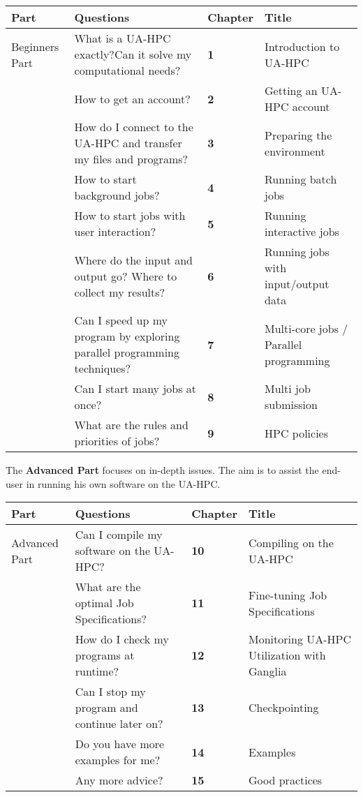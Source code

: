 \begin{tabular}{|p{0.3in}|p{2.0in}|p{0.5in}|p{1.5in}|} \hline
\textbf{Part} & \textbf{Questions} & \textbf{Chapter} & \textbf{Title} \\ \hline
Beginners Part & What is a UA-HPC exactly?\newline Can it solve my computational needs? & \textbf{1} & Introduction to UA-HPC \\ \hline
& How to get an account? & \textbf{2} & Getting an UA-HPC account \\ \hline
& How do I connect to the UA-HPC and transfer my files and programs? & \textbf{3} & Preparing the environment \\ \hline
& How to start background jobs? & \textbf{4} & Running batch jobs \\ \hline
& How to start jobs with user interaction? & \textbf{5} & Running interactive jobs \\ \hline
& Where do the input and output go? Where to collect my results? & \textbf{6} & Running jobs with input/output data \\ \hline
& Can I speed up my program by exploring parallel programming techniques? & \textbf{7} & Multi-core jobs / Parallel programming \\ \hline
& Can I start many jobs at once? & \textbf{8} & Multi job submission \\ \hline
& What are the rules and priorities of jobs? & \textbf{9} & HPC policies \\ \hline
\end{tabular}



The \textbf{Advanced Part} focuses on in-depth issues. The aim is to assist the end-user in running his own software on the UA-HPC.

\begin{tabular}{|p{0.3in}|p{2.0in}|p{0.5in}|p{1.5in}|} \hline
\textbf{Part} & \textbf{Questions} & \textbf{Chapter} & \textbf{Title} \\ \hline
Advanced Part & Can I compile my software on the UA-HPC? & \textbf{10} & Compiling on the UA-HPC \\ \hline
& What are the optimal Job Specifications? & \textbf{11} & Fine-tuning Job Specifications \\ \hline
& How do I check my programs at runtime? & \textbf{12} & Monitoring UA-HPC Utilization with Ganglia \\ \hline
& Can I stop my program and continue later on? & \textbf{13} & Checkpointing \\ \hline
& Do you have more examples for me? & \textbf{14} & Examples \\ \hline
& Any more advice? & \textbf{15} & Good practices \\ \hline
\end{tabular}




